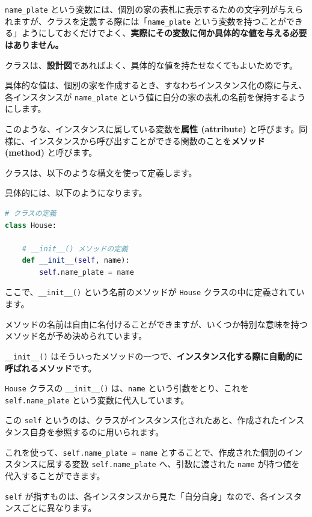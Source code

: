 \texttt{name\_plate} という変数には、個別の家の表札に表示するための文字列が与えられますが、クラスを定義する際には「\texttt{name\_plate} という変数を持つことができる」ようにしておくだけでよく、\textbf{実際にその変数に何か具体的な値を与える必要はありません。}

クラスは、\textbf{設計図}であればよく、具体的な値を持たせなくてもよいためです。

具体的な値は、個別の家を作成するとき、すなわちインスタンス化の際に与え、各インスタンスが \texttt{name\_plate} という値に自分の家の表札の名前を保持するようにします。


このような、インスタンスに属している変数を\textbf{属性 (attribute)} と呼びます。同様に、インスタンスから呼び出すことができる関数のことを\textbf{メソッド (method)} と呼びます。


クラスは、以下のような構文を使って定義します。




具体的には、以下のようになります。


\begin{lstlisting}[style=codecell,language=Python]
# クラスの定義
class House:

    # __init__() メソッドの定義
    def __init__(self, name):
        self.name_plate = name
\end{lstlisting}

ここで、\texttt{\_\_init\_\_()} という名前のメソッドが \texttt{House} クラスの中に定義されています。

メソッドの名前は自由に名付けることができますが、いくつか特別な意味を持つメソッド名が予め決められています。

\texttt{\_\_init\_\_()} はそういったメソッドの一つで、\textbf{インスタンス化する際に自動的に呼ばれるメソッド}です。


\texttt{House} クラスの \texttt{\_\_init\_\_()} は、\texttt{name} という引数をとり、これを \texttt{self.name\_plate} という変数に代入しています。

この \texttt{self} というのは、クラスがインスタンス化されたあと、作成されたインスタンス自身を参照するのに用いられます。

これを使って、\texttt{self.name\_plate = name} とすることで、作成された個別のインスタンスに属する変数 \texttt{self.name\_plate} へ、引数に渡された \texttt{name} が持つ値を代入することができます。

\texttt{self} が指すものは、各インスタンスから見た「自分自身」なので、各インスタンスごとに異なります。

